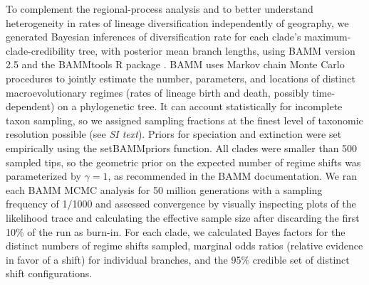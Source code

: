 To complement the regional-process analysis and to better understand
heterogeneity in rates of lineage diversification independently of
geography, we generated Bayesian inferences of diversification rate
for each clade's maximum-clade-credibility tree, with posterior mean
branch lengths, using BAMM version 2.5 and the BAMMtools R package
\citep{Rabosky2014}. BAMM uses Markov chain Monte Carlo procedures to
jointly estimate the number, parameters, and locations of distinct
macroevolutionary regimes (rates of lineage birth and death, possibly
time-dependent) on a phylogenetic tree. It can account statistically
for incomplete taxon sampling, so we assigned sampling fractions at
the finest level of taxonomic resolution possible (see \textit{SI
  text}). Priors for speciation and extinction
were set empirically using the \textrm{setBAMMpriors} function. All
clades were smaller than 500 sampled tips, so the geometric prior on
the expected number of regime shifts was parameterized by
$\gamma = 1$, as recommended in the BAMM documentation. We ran each
BAMM MCMC analysis for 50 million generations with a sampling
frequency of 1/1000 and assessed convergence by visually inspecting
plots of the likelihood trace and calculating the effective sample
size after discarding the first 10\% of the run as burn-in. For each
clade, we calculated Bayes factors for the distinct numbers of regime
shifts sampled, marginal odds ratios (relative evidence in favor of a
shift) for individual branches, and the 95\% credible set of distinct
shift configurations.


